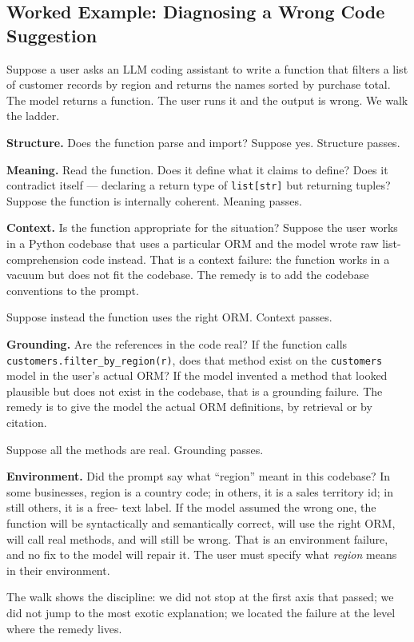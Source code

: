 \subsection{Worked Example: Diagnosing a Wrong Code Suggestion}

Suppose a user asks an LLM coding assistant to write a function
that filters a list of customer records by region and returns the
names sorted by purchase total. The model returns a function. The
user runs it and the output is wrong. We walk the ladder.

\textbf{Structure.} Does the function parse and import? Suppose
yes. Structure passes.

\textbf{Meaning.} Read the function. Does it define what it claims
to define? Does it contradict itself --- declaring a return type
of \texttt{list[str]} but returning tuples? Suppose the function
is internally coherent. Meaning passes.

\textbf{Context.} Is the function appropriate for the situation?
Suppose the user works in a Python codebase that uses a particular
ORM and the model wrote raw list-comprehension code instead. That
is a context failure: the function works in a vacuum but does not
fit the codebase. The remedy is to add the codebase conventions
to the prompt.

Suppose instead the function uses the right ORM. Context passes.

\textbf{Grounding.} Are the references in the code real? If the
function calls \texttt{customers.filter\_by\_region(r)}, does that
method exist on the \texttt{customers} model in the user's actual
ORM? If the model invented a method that looked plausible but does
not exist in the codebase, that is a grounding failure. The remedy
is to give the model the actual ORM definitions, by retrieval or
by citation.

Suppose all the methods are real. Grounding passes.

\textbf{Environment.} Did the prompt say what ``region'' meant in
this codebase? In some businesses, region is a country code; in
others, it is a sales territory id; in still others, it is a free-
text label. If the model assumed the wrong one, the function will
be syntactically and semantically correct, will use the right ORM,
will call real methods, and will still be wrong. That is an
environment failure, and no fix to the model will repair it. The
user must specify what \emph{region} means in their environment.

The walk shows the discipline: we did not stop at the first axis
that passed; we did not jump to the most exotic explanation; we
located the failure at the level where the remedy lives.

